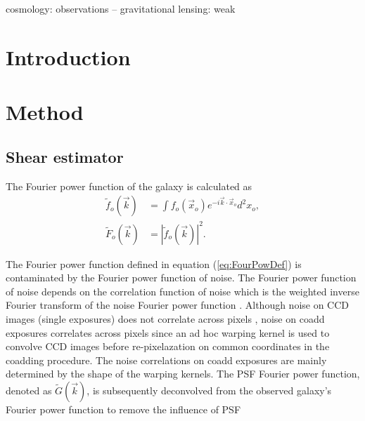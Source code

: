 \documentclass[a4paper,fleqn,usenatbib]{mnras}
\title[FPFS2: Second generation of Fourier Power Function Shapelets}
\author[]{}
\begin{document}
\label{firstpage}
\pagerange{\pageref{firstpage}--\pageref{lastpage}}
\maketitle

\begin{abstract}
\end{abstract}


\begin{keywords}
cosmology: observations -- gravitational lensing: weak
\end{keywords}

\section{Introduction}
\label{sec:Intro}


\section{Method}
\label{sec:Method}

\subsection{Shear estimator}
\label{sec:Method-shapelets}

The Fourier power function of the galaxy is calculated as
\begin{equation} \label{eq:FourPowDef}
\begin{split}
\tilde{f}_o(\vec{k})&=\int f_o(\vec{x}_o) e^{-i\vec{k} \cdot \vec{x}_o} d^2x_o,\\
\tilde{F}_o(\vec{k})&=|\tilde{f}_o(\vec{k})|^2.
\end{split}
\end{equation}


The Fourier power function defined in equation (\ref{eq:FourPowDef}) is
contaminated by the Fourier power function of noise. The Fourier power function
of noise depends on the correlation function of noise which is the weighted
inverse Fourier transform of the noise Fourier power function \citep{Li18FPFS}.
Although noise on CCD images (single exposures) does not correlate across
pixels \citep{Z15}, noise on coadd exposures correlates across pixels since an
ad hoc warping kernel is used to convolve CCD images before re-pixelazation on
common coordinates in the coadding procedure. The noise correlations on coadd
exposures are mainly determined by the shape of the warping kernels.
The PSF Fourier power function, denoted as $\tilde{G}(\vec{k})$, is
subsequently deconvolved from the observed galaxy's Fourier power function to
remove the influence of PSF
\end{document}
